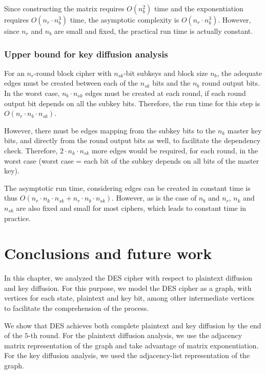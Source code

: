 \documentclass{report}
\begin{document}
Since constructing the matrix requires $O(n_b^2)$ time and the exponentiation requires $O(n_r \cdot n_b^3)$ time, the asymptotic complexity is $O(n_r \cdot n_b^3)$. However, since $n_r$ and $n_b$ are small and fixed, the practical run time is actually constant.

\subsubsection{Upper bound for key diffusion analysis}

For an $n_r$-round block cipher with $n_{sk}$-bit subkeys and block size $n_b$, the adequate edges must be created between each of the $n_{sk}$ bits and the $n_b$ round output bits. In the worst case, $n_b \cdot n_{sk}$ edges must be created at each round, if each round output bit depends on all the subkey bits. Therefore, the run time for this step is $O(n_r \cdot n_b \cdot n_{sk})$. 

However, there must be edges mapping from the subkey bits to the $n_k$ master key bits, and directly from the round output bits as well, to facilitate the dependency check. Therefore, $2 \cdot n_k \cdot n_{sk}$ more edges would be required, for each round, in the worst case (worst case = each bit of the subkey depends on all bits of the master key).

The asymptotic run time, considering edges can be created in constant time is thus $O(n_r \cdot n_k \cdot n_{sk} + n_r \cdot n_b \cdot n_{sk})$. However, as is the case of $n_b$ and $n_r$, $n_k$ and $n_{sk}$ are also fixed and small for most ciphers, which leads to constant time in practice.

\section{Conclusions and future work}
In this chapter, we analyzed the DES cipher with respect to plaintext diffusion and key diffusion. For this purpose, we model the DES cipher as a graph, with vertices for each state, plaintext and key bit, among other intermediate vertices to facilitate the comprehension of the process.

We show that DES achieves both complete plaintext and key diffusion by the end of the $5$-th round. For the plaintext diffusion analysis, we use the adjacency matrix representation of the graph and take advantage of matrix exponentiation. For the key diffusion analysis, we used the adjacency-list representation of the graph.
\end{document}

